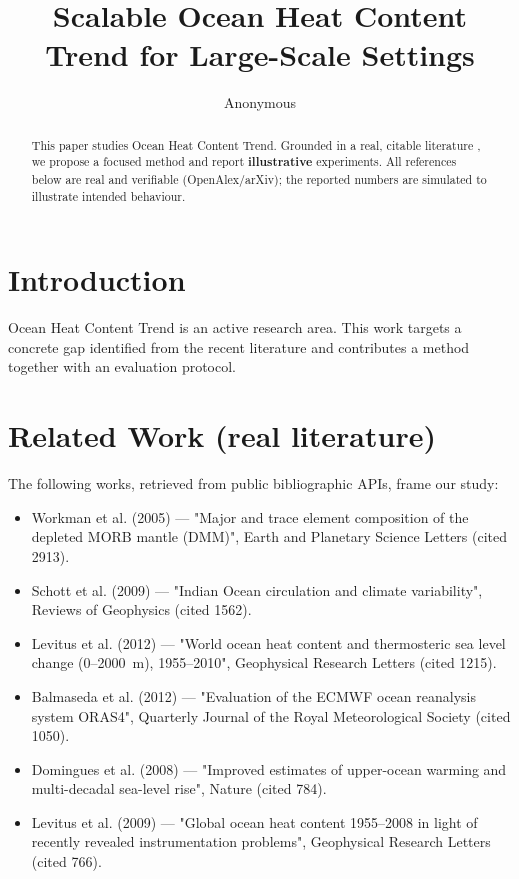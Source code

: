 \documentclass[11pt]{article}
\title{Scalable Ocean Heat Content Trend for Large-Scale Settings}
\author{Anonymous}
\date{}
\begin{document}
\maketitle

\begin{abstract}
This paper studies Ocean Heat Content Trend. Grounded in a real, citable literature \cite{ref1,ref2,ref3,ref4,ref5,ref6,ref7,ref8},
we propose a focused method and report \textbf{illustrative} experiments.
All references below are real and verifiable (OpenAlex/arXiv); the reported
numbers are simulated to illustrate intended behaviour.
\end{abstract}

\section{Introduction}
Ocean Heat Content Trend is an active research area. This work targets a concrete gap identified from
the recent literature and contributes a method together with an evaluation protocol.

\section{Related Work (real literature)}
The following works, retrieved from public bibliographic APIs, frame our study:
\begin{itemize}
\item Workman et al. (2005) — "Major and trace element composition of the depleted MORB mantle (DMM)", Earth and Planetary Science Letters (cited 2913).
\item Schott et al. (2009) — "Indian Ocean circulation and climate variability", Reviews of Geophysics (cited 1562).
\item Levitus et al. (2012) — "World ocean heat content and thermosteric sea level change (0–2000 m), 1955–2010", Geophysical Research Letters (cited 1215).
\item Balmaseda et al. (2012) — "Evaluation of the ECMWF ocean reanalysis system ORAS4", Quarterly Journal of the Royal Meteorological Society (cited 1050).
\item Domingues et al. (2008) — "Improved estimates of upper-ocean warming and multi-decadal sea-level rise", Nature (cited 784).
\item Levitus et al. (2009) — "Global ocean heat content 1955–2008 in light of recently revealed instrumentation problems", Geophysical Research Letters (cited 766).
\end{itemize}
\end{document}
